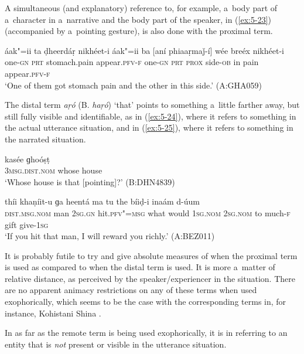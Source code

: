 A simultaneous (and explanatory) reference to, for example, a~body part of a~character in a~narrative and the body part of the speaker, in (\ref{ex:5-23}) (accompanied by a~pointing gesture), is also done with the proximal term.


\begin{exe}
\ex
\label{ex:5-23}
\gll áak"=ii ta ḍheerdáṛ nikhéet-i áak"=ii ba [aní phiaaṛmaǰ-í] wée
breéx nikhéet-i \\
one-\textsc{gn} \textsc{prt} stomach.pain appear.\textsc{pfv-f} one-\textsc{gn} \textsc{prt}
\textsc{prox} side-\textsc{ob} in pain appear.\textsc{pfv-f} \\
\glt `One of them got stomach pain and the other in this side.' (A:GHA059)
\end{exe}
The distal term \textit{aṛó} (B. \textit{haṛó}) `that' points to something a~little farther away, but still fully visible and identifiable, as in (\ref{ex:5-24}), where it refers to something in the actual utterance situation, and in (\ref{ex:5-25}), where it refers to something in the narrated situation. 

\begin{exe}
\ex
\label{ex:5-24}
\gll [haṛó] kasée ɡhoóṣṭ \\
\textsc{3msg.dist.nom} whose house \\
\glt `Whose house is that [pointing]?' (B:DHN4839)

\ex
\label{ex:5-25}
 thíi khaṇíit-u ɡa heentá ma tu the bíiḍ-i inaám d-úum \\
\textsc{dist.msg.nom} man \textsc{2sg.gn} hit.\textsc{pfv"=msg} what would \textsc{1}\textsc{sg.nom} 
\textsc{2sg.nom} to much-\textsc{f} gift give-\textsc{1}\textsc{sg} \\
\glt `If you hit that man, I will reward you richly.' (A:BEZ011)
\end{exe}
It is probably futile to try and give absolute measures of when the proximal term is used as compared to when the distal term is used. It is more a~matter of relative distance, as perceived by the speaker/experiencer in the situation. There are no apparent animacy restrictions on any of these terms when used exophorically, which seems to be the case with the corresponding terms in, for instance, Kohistani Shina \citep[135]{schmidtkohistani2001}.

In as far as the remote term is being used exophorically, it is in referring to an entity that is \textit{not} present or visible in the utterance situation. 


